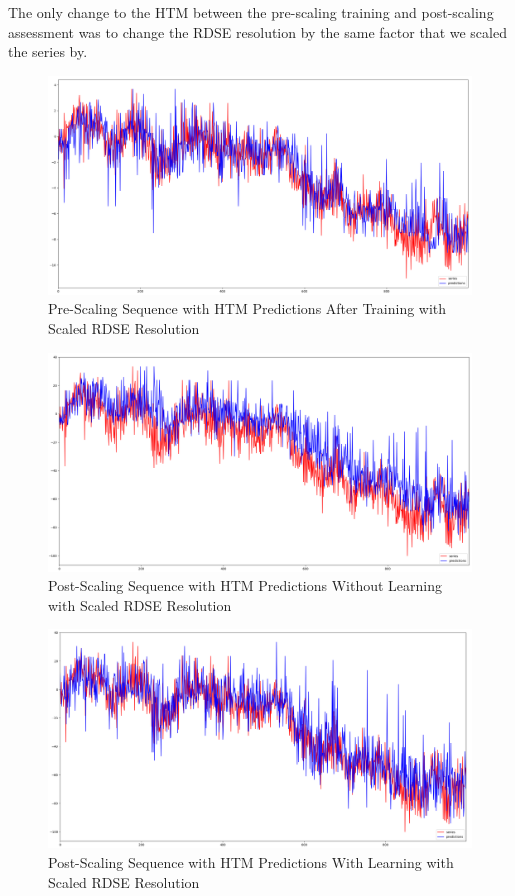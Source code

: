 \documentclass[oneside,12pt,openany]{book}
\begin{document}
    
    The only change to the HTM between the pre-scaling training and post-scaling assessment was to change the RDSE resolution by the same factor that we scaled the series by.
    
     \begin{figure}[hbt!]
        \centering
        \includegraphics[width=\linewidth]{images/NoScaling.png}
        \caption{Pre-Scaling Sequence with HTM Predictions After Training with Scaled RDSE Resolution}
        \label{fig:gennoscalechange}
    \end{figure}
    \begin{figure}[hbt!]
        \centering
        \includegraphics[width=\linewidth]{images/Scaling-NoLearning.png}
        \caption{Post-Scaling Sequence with HTM Predictions Without Learning with Scaled RDSE Resolution}
        \label{fig:genscalenolearningchange}
    \end{figure}
    \begin{figure}[hbt!]
        \centering
        \includegraphics[width=\linewidth]{images/Scaling-Learning.png}
        \caption{Post-Scaling Sequence with HTM Predictions With Learning with Scaled RDSE Resolution}
        \label{fig:genscalelearningchange}
    \end{figure}
    \FloatBarrier
    
\end{document}
